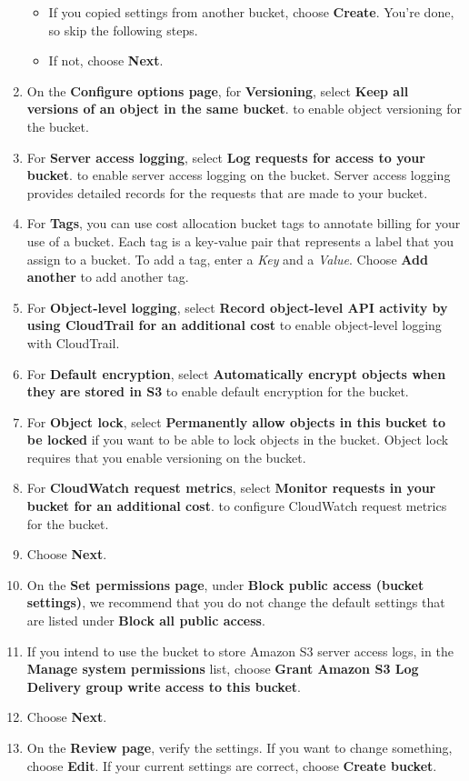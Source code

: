 \documentclass[]{book}
\providecommand{\tightlist}{%
  \setlength{\itemsep}{0pt}\setlength{\parskip}{0pt}}
\begin{document}
\begin{enumerate}
  \begin{itemize}
  \tightlist
  \item
    If you copied settings from another bucket, choose \textbf{Create}. You're done, so skip the following steps.
  \item
    If not, choose \textbf{Next}.
  \end{itemize}
\item
  On the \textbf{Configure options page}, for \textbf{Versioning}, select \textbf{Keep all versions of an object in the same bucket}. to enable object versioning for the bucket.
\item
  For \textbf{Server access logging}, select \textbf{Log requests for access to your bucket}. to enable server access logging on the bucket. Server access logging provides detailed records for the requests that are made to your bucket.
\item
  For \textbf{Tags}, you can use cost allocation bucket tags to annotate billing for your use of a bucket. Each tag is a key-value pair that represents a label that you assign to a bucket. To add a tag, enter a \emph{Key} and a \emph{Value}. Choose \textbf{Add another} to add another tag.
\item
  For \textbf{Object-level logging}, select \textbf{Record object-level API activity by using CloudTrail for an additional cost} to enable object-level logging with CloudTrail.
\item
  For \textbf{Default encryption}, select \textbf{Automatically encrypt objects when they are stored in S3} to enable default encryption for the bucket.
\item
  For \textbf{Object lock}, select \textbf{Permanently allow objects in this bucket to be locked} if you want to be able to lock objects in the bucket. Object lock requires that you enable versioning on the bucket.
\item
  For \textbf{CloudWatch request metrics}, select \textbf{Monitor requests in your bucket for an additional cost}. to configure CloudWatch request metrics for the bucket.\\
\item
  Choose \textbf{Next}.
\item
  On the \textbf{Set permissions page}, under \textbf{Block public access (bucket settings)}, we recommend that you do not change the default settings that are listed under \textbf{Block all public access}.
\item
  If you intend to use the bucket to store Amazon S3 server access logs, in the \textbf{Manage system permissions} list, choose \textbf{Grant Amazon S3 Log Delivery group write access to this bucket}.
\item
  Choose \textbf{Next}.
\item
  On the \textbf{Review page}, verify the settings. If you want to change something, choose \textbf{Edit}. If your current settings are correct, choose \textbf{Create bucket}.
\end{enumerate}
\end{document}
